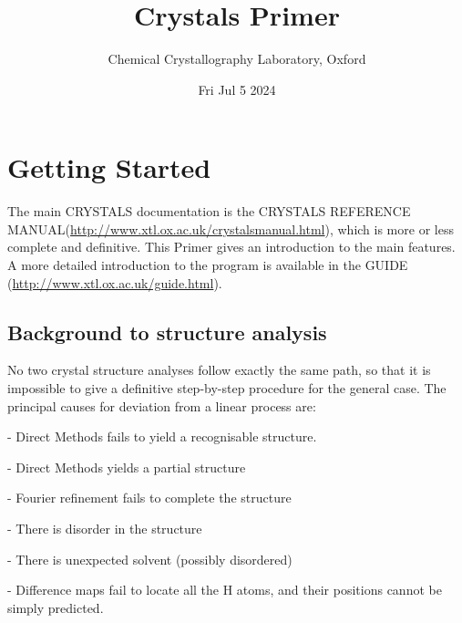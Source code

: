 \documentclass[10pt,a4paper]{report}
\begin{document}
\lhead{\slshape \rightmark}
\chead{}
\rhead{\thepage}
\cfoot{}
\rfoot{}
\renewcommand{\headrulewidth}{0pt}
\renewcommand{\footrulewidth}{0pt}
\fancypagestyle{plain}{%
\fancyhf{}
\fancyfoot[L]{Fri Jul  5  2024}
\fancyfoot[C]{\thepage}
\renewcommand{\headrulewidth}{0pt}
\renewcommand{\footrulewidth}{0pt}}
\newcommand{\Instruction}[1]{{\bf #1}}
\newcommand{\Directive}[1]{{\bf \emph{#1}}}
\newcommand{\Keyword}[1]{\emph{#1}}
\sloppy
\title{Crystals Primer}
\author{Chemical Crystallography Laboratory, Oxford}
\date{Fri Jul  5  2024}
\maketitle
\tableofcontents
\chapter{Getting Started}


The main CRYSTALS documentation is the CRYSTALS REFERENCE MANUAL(\url{http://www.xtl.ox.ac.uk/crystalsmanual.html}), which is more or less complete and definitive. This Primer gives an introduction to the  main features. A more detailed introduction to the program is available in the GUIDE (\url{http://www.xtl.ox.ac.uk/guide.html}).

\section{Background to structure analysis}


No two crystal structure analyses follow exactly the same path, so
that it is impossible to give a definitive step-by-step procedure for
the general case. The principal causes for deviation from a linear
process are:





- Direct Methods fails to yield a recognisable structure.


- Direct Methods yields a partial structure


- Fourier refinement fails to complete the structure


- There is disorder in the structure


- There is unexpected solvent (possibly disordered)


- Difference maps fail to locate all the H atoms, and their positions
   cannot be simply predicted.
\end{document}
